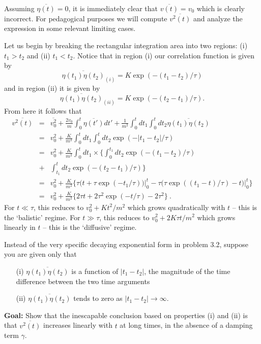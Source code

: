 Assuming $\overline{\eta(t)}=0$, it is immediately clear that $\overline{v(t)}=v_0$ which is clearly incorrect. For pedagogical purposes we will compute $\overline{v^2(t)}$ and analyze the expression in some relevant limiting cases.

Let us begin by breaking the rectangular integration area into two regions: (i) $t_1>t_2$ and (ii) $t_1 < t_2$. Notice that in region (i) our correlation function is given by 
\begin{equation}
\overline{\eta(t_1) \eta(t_2)}_{(i)} = K \exp(-(t_1-t_2)/\tau)
\end{equation}
and in region (ii) it is given by 
\begin{equation}
\overline{\eta(t_1) \eta(t_2)}_{(ii)} = K \exp(-(t_2-t_1)/\tau).
\end{equation}
From here it follows that
\begin{eqnarray}
\overline{v^2(t)}&=& \overline{v_0^2} + \frac{2 v_0 }{m} \int_{0}^{t} \overline{\eta(t')} dt' + \frac{1}{m^2} \int_{0}^{t} dt_1 \int_{0}^{t} dt_2 \overline{\eta(t_1) \eta(t_2)} \nonumber \\
&=& v_0^2 + \frac{K}{m^2} \int_{0}^{t} dt_1 \int_{0}^{t} dt_2 \exp(-|t_1-t_2|/\tau) \nonumber \\
&=& v_0^2 + \frac{K}{m^2} \int_{0}^{t} dt_1 \times \bigg\{ \int_{0}^{t_1} dt_2 \exp(-(t_1-t_2)/\tau) \nonumber \\ &+& \int_{t_1}^{t} dt_2 \exp(-(t_2-t_1)/\tau)\bigg\} \nonumber \\
&=& v_0^2 + \frac{K}{m^2} \bigg\{ \tau \bigg(t + \tau \exp(-t_1/\tau)\bigg) \bigg|_{0}^{t} - \tau \bigg(\tau \exp((t_1-t)/\tau)-t\bigg) \bigg|_{0}^{t} \bigg\} \nonumber \\
&=& \boxed{v_0^2 + \frac{K}{m^2} \bigg\{ 2 \tau t  + 2 \tau^2 \exp(-t/\tau) -2 \tau^2 \bigg\}}~.
\end{eqnarray}
For $t\ll\tau$, this reduces to $v_0^2+K t^2 / m^2$ which grows quadratically with $t$ -- this is the `balistic' regime. For $t\gg \tau$, this reduces to $v_0^2+2K \tau t / m^2$ which grows linearly in $t$ -- this is the `diffusive' regime.



Instead of the very specific decaying exponential form in problem 3.2, suppose you are given only that
\begin{itemize}
\item[(i)] $\overline{\eta(t_1) \eta(t_2)}$ is a function of $|t_1-t_2|$, the magnitude of the 
time difference between the two time arguments
\item[(ii)] $\overline{\eta(t_1) \eta(t_2)}$ tends to zero as $|t_1-t_2|\rightarrow\infty$.
\end{itemize}
\textbf{Goal:} Show that the inescapable conclusion based on properties (i) and (ii) is that $\overline{v^2(t)}$ increases linearly with $t$ at long times, in the absence of a damping term $\gamma$.

